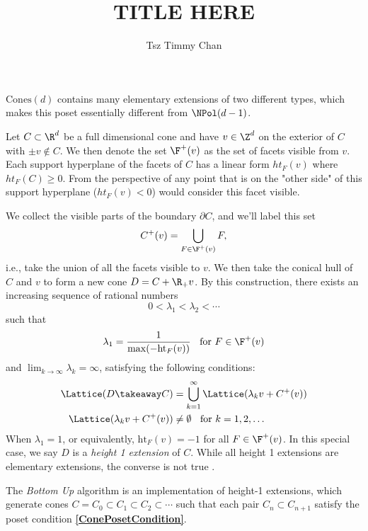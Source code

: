 \documentclass{TC}
\title{TITLE HERE}	%
\author{Tsz Timmy Chan}	%
\begin{document}
$\mathrm{Cones}(d)$ contains many elementary extensions of two different types, which makes this poset essentially different from $\NPol(d-1)$.

Let $C \subset \R^d$ be a full dimensional cone and have $v \in \Z^d$ on the exterior of $C$ with $\pm v \notin C$. We then denote the set $\F^+(v)$ as the set of facets visible from $v$. Each support hyperplane of the facets of $C$ has a linear form $ht_F(v) $ where $ht_F(C) \geq 0$. From the perspective of any point that is on the "other side" of this support hyperplane ($ht_F(v) < 0$) would consider this facet visible. 

We collect the visible parts of the boundary $\partial C$, and we'll label this set $$C^+(v) = \displaystyle\bigcup_{F \in \F^+(v)} F,$$ i.e., take the union of all the facets visible to $v$. We then take the conical hull of $C$ and $v$ to form a new cone $D = C + \R_+ v$. By this construction, there exists an increasing sequence of rational numbers $$0 < \lambda_1 < \lambda_2 < \cdots$$ such that $$\lambda_1 = \frac{1}{\max(-\mathrm{ht}_F(v))} \;\; \text{ for } F \in \F^+(v) $$ and $\lim_{k \to \infty} \lambda_k = \infty$, satisfying the following  conditions:
\begin{align*}
\Lattice(D \takeaway C) &= \bigcup_{k=1}^\infty \Lattice(\lambda_k v + C^+(v)) \\
\Lattice(\lambda_k v + C^+(v)) &\neq \emptyset \;\; \text{ for } k = 1,2,\dots
\end{align*}
When $\lambda_1 = 1$, or equivalently, $\mathrm{ht}_F(v) = -1$ for all $F \in \F^+(v)$. In this special case, we say $D$ is a \emph{height 1 extension} of $C$. While all height 1 extensions are elementary extensions, the converse is not true \cite{BrunsGubeladzeNormalPolytopes}. 


\begin{lemma}\label{bottomupposetlemma}
The \emph{Bottom Up} algorithm is an implementation of height-1 extensions, which generate cones $C = C_0 \subset C_1 \subset C_2 \subset \cdots$ such that each pair $C_{n} \subset C_{n+1}$ satisfy the poset condition \textbf{\ref{ConePosetCondition}}.
\end{lemma}
\end{document}

